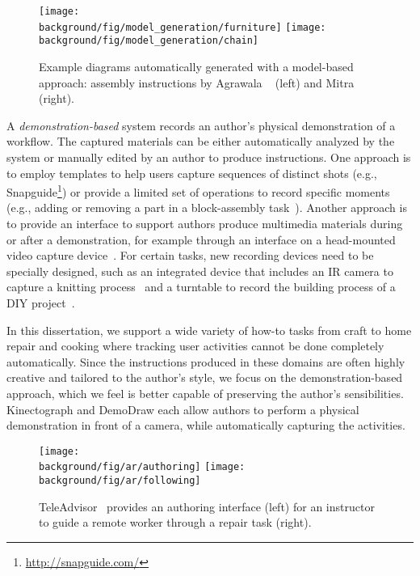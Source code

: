 \begin{figure*}[t!]
  \centering
  \texttt{[image: \\background/fig/model\_generation/furniture]}
  \texttt{[image: \\background/fig/model\_generation/chain]}
  \caption{Example diagrams automatically generated with a model-based approach: assembly instructions by Agrawala \ea~\cite{agrawala2003designing} (left) and Mitra \ea~\cite{mitra2010illustrating} (right).}
  \label{fig:related_models}
\end{figure*}

A \emph{demonstration-based} system records an author's physical demonstration of a workflow. The captured materials can be either automatically analyzed by the system or manually edited by an author to produce instructions.
%
One approach is to employ templates to help users capture sequences of distinct shots (e.g., Snapguide\footnote{\url{http://snapguide.com/}}) or provide a limited set of operations to record specific moments (e.g., adding or removing a part in a block-assembly task~\cite{Ranjan:2007,Gupta2012DuploTrack}).
%
Another approach is to provide an interface to support authors produce multimedia materials during or after a demonstration, for example through an interface on a head-mounted video capture device~\cite{carter2015authoring}. For certain tasks, new recording devices need to be specially designed, such as an integrated device that includes an IR camera to capture a knitting process~\cite{Rosner:2008:SAK:1409635.1409682} and a turntable to record the building process of a DIY project~\cite{Tseng:2015:SPT:2771839.2771869}.

In this dissertation, we support a wide variety of how-to tasks from craft to home repair and cooking where tracking user activities cannot be done completely automatically. Since the instructions produced in these domains are often highly creative and tailored to the author's style, we focus on the demonstration-based approach, which we feel is better capable of preserving the author's sensibilities.
%
Kinectograph and DemoDraw each allow authors to perform a physical demonstration in front of a camera, while automatically capturing the activities.


\begin{figure*}[t!]
  \centering
  \texttt{[image: \\background/fig/ar/authoring]}
  \texttt{[image: \\background/fig/ar/following]}
  \caption{TeleAdvisor~\cite{Gurevich:2012ko} provides an authoring interface (left) for an instructor to guide a remote worker through a repair task (right).}
  \label{fig:related_teleadvisor}
\end{figure*}

